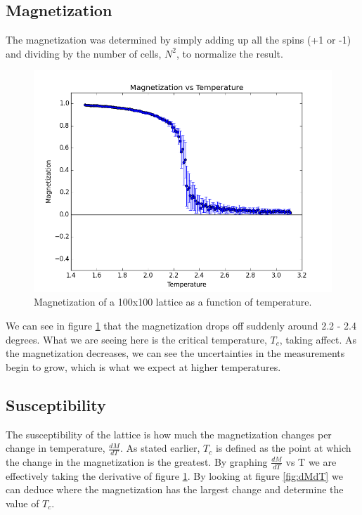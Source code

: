 \documentclass[a4paper,twoside,12pt]{article}
\begin{document}
\subsection{Magnetization}
The magnetization was determined by simply adding up all the spins (+1 or -1) and dividing by the number of cells, $N^2$, to normalize the result.

\begin{figure}[h]
\centering
\includegraphics[scale=0.5]{Figures/Mag.png}
\caption{Magnetization of a 100x100 lattice as a function of temperature.}
\label{fig:Mag}
\end{figure} 

\noindent We can see in figure \ref{fig:Mag} that the magnetization drops off suddenly around 2.2 - 2.4 degrees. What we are seeing here is the critical temperature, $T_{c}$, taking affect. As the magnetization decreases, we can see the uncertainties in the measurements begin to grow, which is what we expect at higher temperatures. 

\subsection{Susceptibility}
The susceptibility of the lattice is how much the magnetization changes per change in temperature, $\frac{dM}{dT}$. As stated earlier, $T_{c}$ is defined as the point at which the change in the magnetization is the greatest. By graphing $\frac{dM}{dT}$ vs T we are effectively taking the derivative of figure \ref{fig:Mag}. By looking at figure \ref{fig:dMdT} we can deduce where the magnetization has the largest change and determine the value of $T_{c}$.
\end{document}
